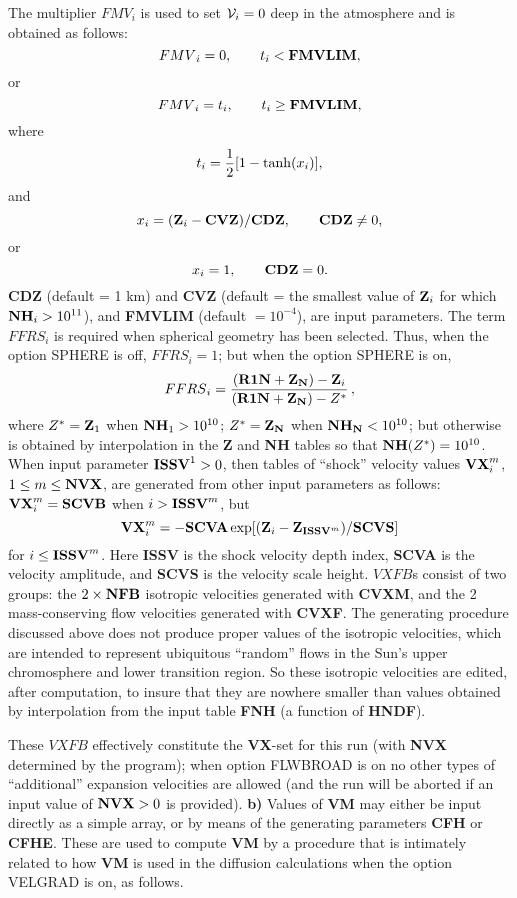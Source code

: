 The multiplier ${FMV}_i$ is used to set ${\cal V}_i = 0$ deep in the
atmosphere and is obtained as follows:
$$ {FMV}_i = 0, \qquad t_i < {\bf FMVLIM} , $$
or
$$ {FMV}_i = t_i, \qquad t_i \geq {\bf FMVLIM} , $$
where
$$ t_i = {1 \over 2} [ 1 - \tanh (x_i) ] , $$
and
$$ x_i = ({\bf Z}_i - {\bf CVZ}) / {\bf CDZ}, \qquad {\bf CDZ} \neq 0 , $$
or
$$ x_i = 1, \qquad {\bf CDZ} = 0 . $$
{\bf CDZ} (default = 1 km) and {\bf CVZ} (default = the smallest value of
${\bf Z}_i$ for which ${\bf NH}_i > {10}^{11}$), and {\bf FMVLIM} (default
 $ = 10^{-4}$), are input parameters.
\ej
The term ${FFRS}_i$ is required when spherical geometry has been selected. \break
Thus, when the option SPHERE is off, ${FFRS}_i = 1$; but when the option \break
SPHERE is on,
$$ {FFRS}_i = { { ({\bf R1N} + {\bf Z}_{\bf N}) - {\bf Z}_i } \over
                { ({\bf R1N} + {\bf Z}_{\bf N}) - Z^* } } \, , $$
where $Z^* = {\bf Z}_1$ when ${\bf NH}_1 > 10^{10}$; $Z^* = {\bf Z}_{\bf N}$
when ${\bf NH}_{\bf N} < 10^{10}$; but otherwise is obtained by interpolation
in the {\bf Z} and {\bf NH} tables so that ${\bf NH}(Z^*) = 10^{10}$.
\blankline
\blankline
{}
\blankline
When input parameter ${\bf ISSV}^1 > 0$, then tables of ``shock'' 
velocity values ${\bf VX}^m_i$,
$1 \leq m \le {\bf NVX}$, are generated from other input parameters as follows:
\break $ {\bf VX}^m_i = {\bf SCVB}$ when $i > {\bf ISSV}^m$, but
$$ {\bf VX}^m_i = - {\bf SCVA} \exp [({\bf Z}_i - {\bf Z}_{{\bf ISSV}^m})
                    / {\bf SCVS} ] $$
for $i \leq {\bf ISSV}^m$. Here {\bf ISSV} is the shock velocity depth index,
{\bf SCVA} is the velocity amplitude, and {\bf SCVS} is the velocity scale height.
\blankline
\blankline
{}
\blankline
$VXFB$s consist of two groups: the $2 \times {\bf NFB}$ isotropic velocities
generated with {\bf CVXM}, and the 2 mass-conserving flow velocities
generated with {\bf CVXF}.
The generating procedure discussed above does not produce proper values of the
isotropic velocities, which are intended to represent ubiquitous ``random'' flows
in the Sun's upper chromosphere and lower transition region. So these isotropic
velocities are edited, after computation, to insure that they are nowhere smaller
than values obtained by interpolation from the input table {\bf FNH}
(a function of {\bf HNDF}).

These $VXFB$ effectively constitute the {\bf VX}-set for this run (with {\bf NVX}
determined by the program); when option FLWBROAD is on no other types of
``additional'' expansion velocities are allowed (and the run will be aborted if
an input value of ${\bf NVX} > 0$ is provided).
\ej
{\bf b)} Values of {\bf VM} may either be input directly as a simple array, or by
means of the generating parameters {\bf CFH} or {\bf CFHE}. These are used
to compute {\bf VM} by a procedure that is intimately related to how {\bf VM}
is used in the diffusion calculations when the option VELGRAD is on, as follows.

